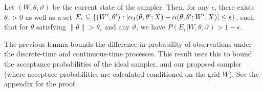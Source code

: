 \begin{proposition}
  Let $(W, \theta, \vartheta)$ be the current state of the sampler.
Then, for any $\epsilon$, there exists $\theta_\epsilon > 0$ as well as a set $E_\epsilon \subseteq \{(W', \theta'): |\alpha_I(\theta,\theta';X) - \alpha(\theta,\theta';W',X)| \le \epsilon\}$, such that for $\theta$ satisfying $\| \theta \| > \theta_\epsilon$ and any $\vartheta$, we have
$P(E_\epsilon|W,\theta,\vartheta) > 1-\epsilon$.
\label{prop:mix0}
\end{proposition}
The previous lemma bounds the difference in probability of observations 
under the discrete-time and continuous-time processes. This result 
uses this to bound the acceptance probabilities of the ideal sampler, 
and our proposed sampler (where acceptace probabilities are calculated 
conditioned on the grid $W$). See the appendix for the proof.

